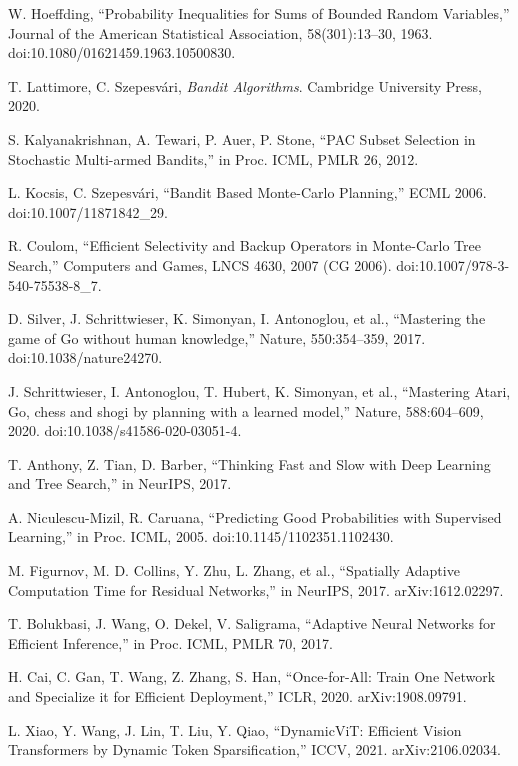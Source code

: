 \begin{thebibliography}{99}
W. Hoeffding, ``Probability Inequalities for Sums of Bounded Random Variables,'' Journal of the American Statistical Association, 58(301):13--30, 1963. doi:10.1080/01621459.1963.10500830.

T. Lattimore, C. Szepesvári, \emph{Bandit Algorithms}. Cambridge University Press, 2020.

S. Kalyanakrishnan, A. Tewari, P. Auer, P. Stone, ``PAC Subset Selection in Stochastic Multi-armed Bandits,'' in Proc. ICML, PMLR 26, 2012.

L. Kocsis, C. Szepesvári, ``Bandit Based Monte-Carlo Planning,'' ECML 2006. doi:10.1007/11871842\_29.

R. Coulom, ``Efficient Selectivity and Backup Operators in Monte-Carlo Tree Search,'' Computers and Games, LNCS 4630, 2007 (CG 2006). doi:10.1007/978-3-540-75538-8\_7.

D. Silver, J. Schrittwieser, K. Simonyan, I. Antonoglou, et al., ``Mastering the game of Go without human knowledge,'' Nature, 550:354--359, 2017. doi:10.1038/nature24270.

J. Schrittwieser, I. Antonoglou, T. Hubert, K. Simonyan, et al., ``Mastering Atari, Go, chess and shogi by planning with a learned model,'' Nature, 588:604--609, 2020. doi:10.1038/s41586-020-03051-4.

T. Anthony, Z. Tian, D. Barber, ``Thinking Fast and Slow with Deep Learning and Tree Search,'' in NeurIPS, 2017.

A. Niculescu-Mizil, R. Caruana, ``Predicting Good Probabilities with Supervised Learning,'' in Proc. ICML, 2005. doi:10.1145/1102351.1102430.

M. Figurnov, M. D. Collins, Y. Zhu, L. Zhang, et al., ``Spatially Adaptive Computation Time for Residual Networks,'' in NeurIPS, 2017. arXiv:1612.02297.

T. Bolukbasi, J. Wang, O. Dekel, V. Saligrama, ``Adaptive Neural Networks for Efficient Inference,'' in Proc. ICML, PMLR 70, 2017.

H. Cai, C. Gan, T. Wang, Z. Zhang, S. Han, ``Once-for-All: Train One Network and Specialize it for Efficient Deployment,'' ICLR, 2020. arXiv:1908.09791.

L. Xiao, Y. Wang, J. Lin, T. Liu, Y. Qiao, ``DynamicViT: Efficient Vision Transformers by Dynamic Token Sparsification,'' ICCV, 2021. arXiv:2106.02034.


\end{thebibliography}

